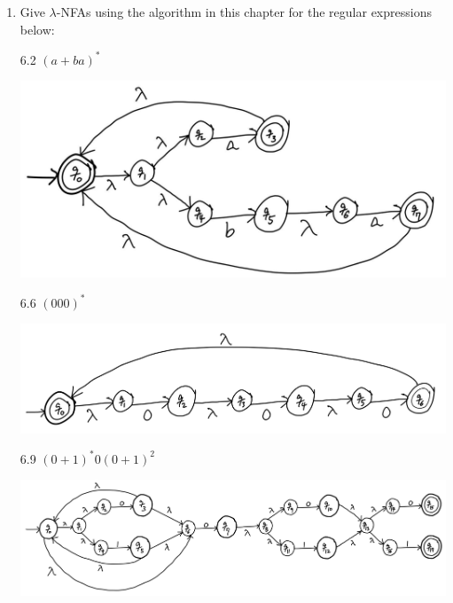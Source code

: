 \documentclass[10pt]{article}
\begin{document}
\begin{enumerate}[label={}]
            $(a+b)^*a(a+b)^*b(a+b)^* + (a+b)^*b(a+b)^*a(a+b)^*$

            5.20 Does not contain the substring $aa$

            $(b^*+(ab)^*)^*(\lambda + a)$

            \[\Sigma = \{0-9,-\}\]

            5.24 Valid integer (no leading 0s, but could be negative)

            $(0 + (1+2+3+4+5+6+7+8+9)(0+1+2+3+4+5+6+7+8+9)^*)+(-(0 + (1+2+3+4+5+6+7+8+9)(0+1+2+3+4+5+6+7+8+9)^*))$

      \item Give $\lambda$-NFAs using the algorithm in this chapter for the regular expressions below:

            6.2 $(a+b a)^*$

            \includegraphics[scale=0.2]{6.2}

            6.6 $(000)^*$

            \includegraphics[scale=0.35]{6.6}

            6.9 $(0+1)^* 0(0+1)^2$

            \includegraphics[scale=0.5]{6.9}


\end{enumerate}
\end{document}
